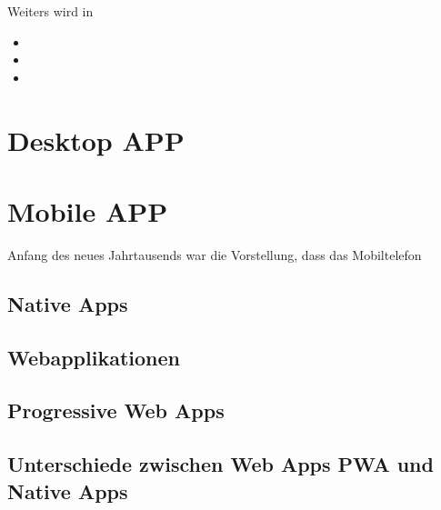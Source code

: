 Weiters wird in 

\begin{itemize}
    \item 
	\item 
	\item 
\end{itemize}



\newpage
\section{Desktop APP}


\section{Mobile APP}
Anfang des neues Jahrtausends war die Vorstellung, dass das Mobiltelefon  


\subsection{Native Apps}





\subsection{Webapplikationen}


\subsection{Progressive Web Apps}


\subsection{Unterschiede zwischen Web Apps PWA und Native Apps}

\newpage
